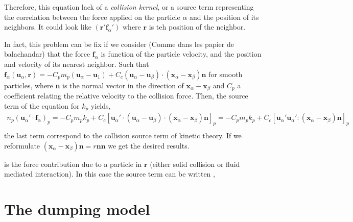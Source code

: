 Therefore, this equation lack of a  \textit{collision kernel}, or a source term representing the correlation between the force applied on the particle $\alpha$ and the position of its neighbors.
It could look like $(\textbf{r}' \textbf{f}_\alpha')$ where $\textbf{r}$ is teh position of the neighbor. 

In fact, this problem can be fix if we consider (Comme dans les papier de balachandar)
that the force $\textbf{f}_\alpha$ is function of the particle velocity, and the position and velocity of its nearest neighbor. 
Such that $\textbf{f}_\alpha(\textbf{u}_\alpha,\textbf{r})  = - C_p m_p  (\textbf{u}_\alpha - \textbf{u}_1) +  C_c(\textbf{u}_\alpha - \textbf{u}_\beta)\cdot(\textbf{x}_\alpha - \textbf{x}_\beta) \textbf{n}$ for smooth particles, where \textbf{n} is the normal vector in the direction of $\textbf{x}_\alpha - \textbf{x}_\beta$ and $C_p$ a coefficient relating the relative velocity to the collision force. 
Then, the source term of the equation for $k_p$ yields,
\begin{multline*}
    n_p (\textbf{u}_\alpha' \cdot \textbf{f}_\alpha)_p
    = - C_p m_p k_p
    +  C_c [\textbf{u}_\alpha' \cdot (\textbf{u}_\alpha - \textbf{u}_\beta)\cdot(\textbf{x}_\alpha - \textbf{x}_\beta) \textbf{n}]_p
    = - C_p m_p k_p
    +  C_c [\textbf{u}_\alpha'  \textbf{u}_\alpha' : (\textbf{x}_\alpha - \textbf{x}_\beta) \textbf{n}]_p
    \\
\end{multline*}
the last term correspond to the collision source term of kinetic theory. 
If we reformulate $(\textbf{x}_\alpha - \textbf{x}_\beta) \textbf{n} = r \textbf{n}\textbf{n}$ we get the desired results. 


is the force contribution due to a particle in $\textbf{r}$ (either solid collision or fluid mediated interaction). 
In this case the source term can be written ,

\section{The dumping model}

